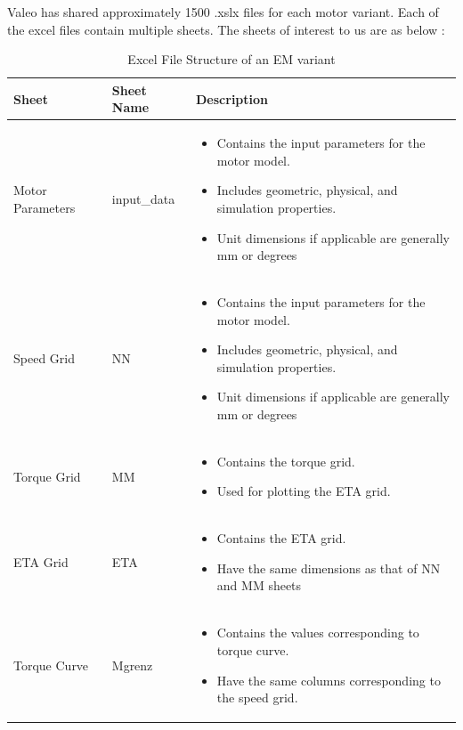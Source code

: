 \documentclass{report} %
\begin{document}
Valeo has shared approximately 1500 .xslx files for each motor variant. Each of the excel files contain multiple sheets.
The sheets of interest to us are as below :
\begin{table}[H]
    \centering
    \begin{tabular}{|p{2cm}|p{2cm}|p{11cm}|}
    \hline {\bf Sheet} & {\bf Sheet Name} & {\bf Description}\\
    \hline Motor Parameters & input\_data & 
    \begin{itemize}
        \item Contains the input parameters for the motor model.
        \item Includes geometric, physical, and simulation properties.
        \item Unit dimensions if applicable are generally mm or degrees 
    \end{itemize}\\
    Speed Grid & NN & 
    \begin{itemize}
        \item Contains the input parameters for the motor model.
        \item Includes geometric, physical, and simulation properties.
        \item Unit dimensions if applicable are generally mm or degrees 
    \end{itemize}\\
    Torque Grid & MM & 
    \begin{itemize}
        \item Contains the torque grid.
        \item Used for plotting the ETA grid.
    \end{itemize}\\
    ETA Grid & ETA & 
    \begin{itemize}
        \item Contains the ETA grid.
        \item Have the same dimensions as that of NN and MM sheets
    \end{itemize}\\
    Torque Curve & Mgrenz & 
    \begin{itemize}
        \item Contains the values corresponding to torque curve.
        \item Have the same columns corresponding to the speed grid.
    \end{itemize}\\
    \hline
    \end{tabular}
    \caption{Excel File Structure of an \ac{EM} variant}
\end{table}
\end{document}
